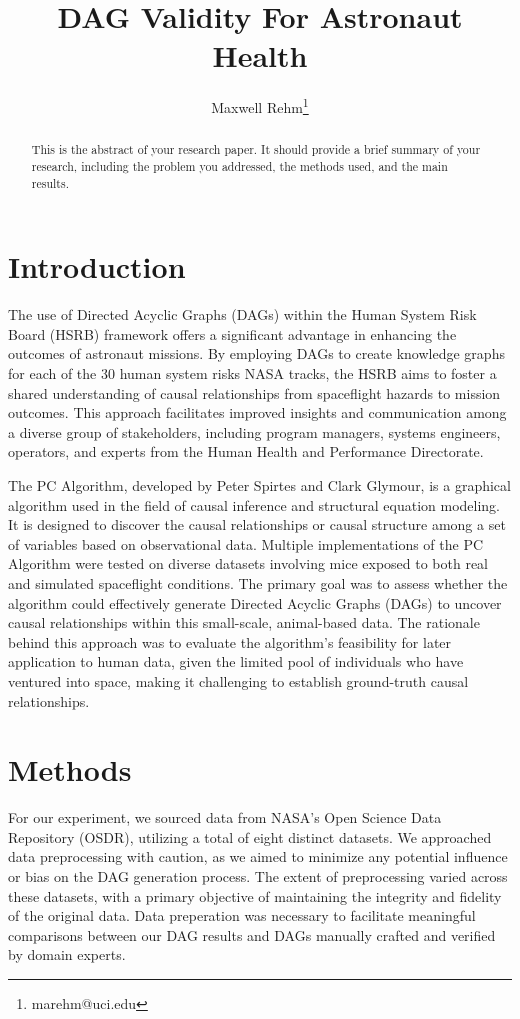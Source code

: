 \documentclass{article}
\title{DAG Validity For Astronaut Health}
\author{Maxwell Rehm\thanks{marehm@uci.edu}}
\begin{document}
\maketitle

\begin{abstract}
This is the abstract of your research paper. It should provide a brief summary of your research, including the problem you addressed, the methods used, and the main results.
\end{abstract}

\section{Introduction}

The use of Directed Acyclic Graphs (DAGs) within the Human System Risk Board (HSRB) framework offers a significant advantage in enhancing the outcomes of astronaut missions. By employing DAGs to create knowledge graphs for each of the 30 human system risks NASA tracks, the HSRB aims to foster a shared understanding of causal relationships from spaceflight hazards to mission outcomes. This approach facilitates improved insights and communication among a diverse group of stakeholders, including program managers, systems engineers, operators, and experts from the Human Health and Performance Directorate. 

The PC Algorithm, developed by Peter Spirtes and Clark Glymour, is a graphical algorithm used in the field of causal inference and structural equation modeling. It is designed to discover the causal relationships or causal structure among a set of variables based on observational data. Multiple implementations of the PC Algorithm were tested on diverse datasets involving mice exposed to both real and simulated spaceflight conditions. The primary goal was to assess whether the algorithm could effectively generate Directed Acyclic Graphs (DAGs) to uncover causal relationships within this small-scale, animal-based data. The rationale behind this approach was to evaluate the algorithm's feasibility for later application to human data, given the limited pool of individuals who have ventured into space, making it challenging to establish ground-truth causal relationships.

\section{Methods}

For our experiment, we sourced data from NASA's Open Science Data Repository (OSDR), utilizing a total of eight distinct datasets. We approached data preprocessing with caution, as we aimed to minimize any potential influence or bias on the DAG generation process. The extent of preprocessing varied across these datasets, with a primary objective of maintaining the integrity and fidelity of the original data. Data preperation was necessary to facilitate meaningful comparisons between our DAG results and DAGs manually crafted and verified by domain experts.
\end{document}
